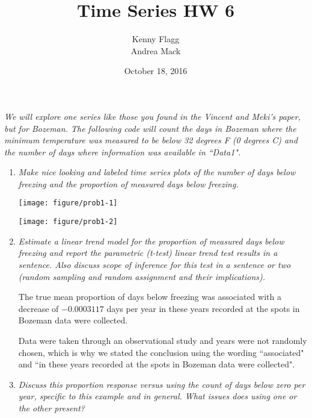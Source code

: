 \documentclass[11pt]{article}
\title{Time Series HW 6}
\author{Kenny Flagg \\ Andrea Mack}
\date{October 18, 2016}
\begin{document}
\maketitle



{\it We will explore one series like those you found in the Vincent and Meki's paper, but for Bozeman. The following code will count the days in Bozeman where the minimum temperature was measured to be below 32 degrees F (0 degrees C) and the number of days where information was available in ``Data1". }


\begin{enumerate}

\item%
{\it Make nice looking and labeled time series plots of the number of days below freezing and the proportion of measured days below freezing.}

\begin{knitrout}\footnotesize
{}\color{fgcolor}

{\centering \texttt{[image: figure/prob1-1]} 

}




{\centering \texttt{[image: figure/prob1-2]} 

}



\end{knitrout}


\item%
{\it Estimate a linear trend model for the proportion of measured days below freezing and report the parametric (t-test) linear trend test results in a sentence. Also discuss scope of inference for this test in a sentence or two (random sampling and random assignment and their implications).}



The true mean proportion of days below freezing was associated with a decrease of \ensuremath{-0.0003117} days per year in these years recorded at the spots in Bozeman data were collected.

Data were taken through an observational study and years were not randomly chosen, which is why we stated the conclusion using the wording ``associated" and ``in these years recorded at the spots in Bozeman data were collected". %

\item%
{\it Discuss this proportion response versus using the count of days below zero per year, specific to this example and in general. What issues does using one or the other present?}


\end{enumerate}
\end{document}

